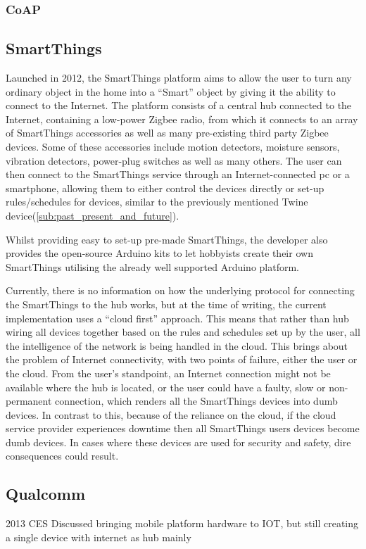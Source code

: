 

\subsubsection{CoAP} %
\label{ssub:coap}


\subsection{SmartThings} %
\label{sub:smart_things}
Launched in 2012, the SmartThings platform aims to allow the user to turn any ordinary object in the home into a ``Smart'' object by giving it the ability to connect to the Internet. The platform consists of a central hub connected to the Internet, containing a low-power Zigbee radio, from which it connects to an array of SmartThings accessories as well as many pre-existing third party Zigbee devices. Some of these accessories include motion detectors, moisture sensors, vibration detectors, power-plug switches as well as many others. The user can then connect to the SmartThings service through an Internet-connected pc or a smartphone, allowing them to either control the devices directly or set-up rules/schedules for devices, similar to the previously mentioned Twine device(\ref{sub:past_present_and_future}). 

Whilst providing easy to set-up pre-made SmartThings, the developer also provides the open-source Arduino kits to let hobbyists create their own SmartThings utilising the already well supported Arduino platform.

Currently, there is no information on how the underlying protocol for connecting the SmartThings to the hub works, but at the time of writing, the current implementation uses a ``cloud first'' approach. This means that rather than hub wiring all devices together based on the rules and schedules set up by the user, all the intelligence of the network is being handled in the cloud. This brings about the problem of Internet connectivity, with two points of failure, either the user or the cloud. From the user's standpoint, an Internet connection might not be available where the hub is located, or the user could have a faulty, slow or non-permanent connection, which renders all the SmartThings devices into dumb devices. In contrast to this, because of the reliance on the cloud, if the cloud service provider experiences downtime then all SmartThings users devices become dumb devices. In cases where these devices are used for security and safety, dire consequences could result.
  



\subsection{Qualcomm} %
\label{sub:qualcomm}
2013 CES Discussed bringing mobile platform hardware to IOT, but still creating a single device with internet as hub mainly 


